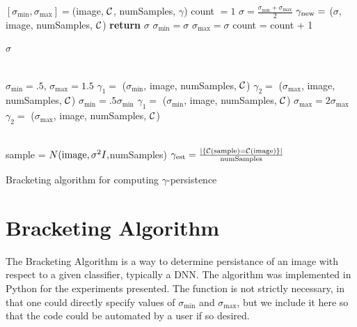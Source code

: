\begin{algorithm} [h!]
\begin{algorithmic}

\State $[\sigma_{\min},\sigma_{\max}] = $(image, $\mathcal{C}$, numSamples, $\gamma$)
\State count $=1$
\State $\sigma = \frac{\sigma_{\min}+\sigma_{\max}}{2}$
\State $\gamma_{\textnormal{new}} =$ ($\sigma$, image, numSamples, $\mathcal{C}$)
\State \textbf{return} $\sigma$ %
\State $\sigma_{\min} = \sigma$
\Else
\State $\sigma_{\max} = \sigma$
\EndIf
\State count = count + 1
\EndWhile

\Return $\sigma$
\EndFunction

\\
\State $\sigma_{\min}=.5$,\;\; $\sigma_{\max}=1.5$
\State $\gamma_1 =$ ($\sigma_{\min}$, image, numSamples, $\mathcal{C}$)
\State $\gamma_2 =$ ($\sigma_{\max}$, image, numSamples, $\mathcal{C}$)
\State $\sigma_{\min} = .5\sigma_{\min}$
\State $\gamma_1 =$ ($\sigma_{\min}$, image, numSamples, $\mathcal{C}$)
\EndIf
{}
\State $\sigma_{\max} = 2\sigma_{\max}$
\State $\gamma_2 =$ ($\sigma_{\max}$, image, numSamples, $\mathcal{C}$)
\EndIf
\EndWhile

\Return{$[\sigma_{\min}, \sigma_{\max}]$}
\EndFunction

\\
\State sample = $N(\textnormal{image},\sigma^2I,$numSamples)
\State $\gamma_{\textnormal{est}} = \frac{|\{\mathcal{C}(\textnormal{sample})=\mathcal{C}(\textnormal{image})\}|}{\textnormal{numSamples}}$

\EndFunction
\end{algorithmic}
\caption{Bracketing algorithm for computing $\gamma$-persistence}\label{bracketing}
\end{algorithm}


\section{Bracketing Algorithm}\label{sec:bracketing}
The Bracketing Algorithm is a way to determine persistance of an image with respect to a given classifier, typically a DNN. The algorithm was implemented in Python for the experiments presented. The  function is not strictly necessary, in that one could directly specify values of $\sigma_{\min}$ and $\sigma_{\max}$, but we include it here so that the code could be automated by a user if so desired.  

